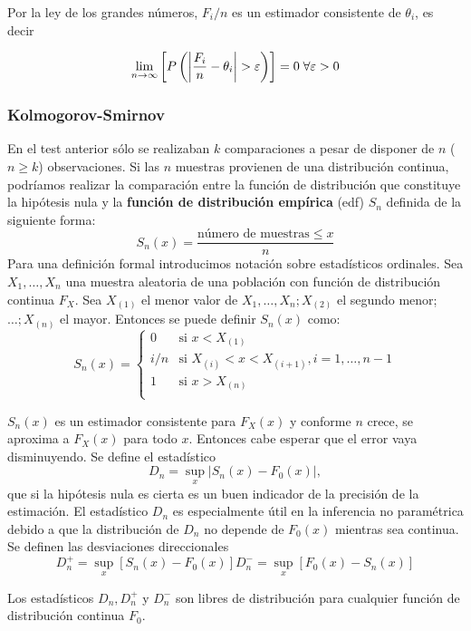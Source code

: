 	Por la ley de los grandes números, $F_i/n$ es un 
estimador consistente de $\theta_i$, es decir
	
	\[ \lim_{n \rightarrow \infty} \left[
			P \left(
				\left\lvert \frac{F_i}{n} - \theta_i \right\rvert 
					> \varepsilon
			\right) \right] = 0 \; \forall \varepsilon > 0 \]
	
	\subsubsection{Kolmogorov-Smirnov}
	
	En el test anterior sólo se realizaban $k$ comparaciones 
a pesar de disponer de $n$ ($n \geq k$) observaciones. Si las 
$n$ muestras provienen de una distribución continua, 
podríamos realizar la comparación entre la función de 
distribución que constituye la hipótesis nula y la 
\textbf{función de distribución empírica} (edf) $S_n$ 
definida de la siguiente forma:
	\[ S_n(x) = \frac{\text{número de muestras} \leq x}{n} \]
	Para una definición formal introducimos notación sobre 
estadísticos ordinales. Sea $X_1, \dots, X_n$ una muestra 
aleatoria de una población con función de distribución 
continua $F_X$. Sea $X_{(1)}$ el menor valor de $X_1, \dots, 
X_n; X_{(2)}$ el segundo menor;$ \dots; X_{(n)}$ el mayor. 
Entonces se puede definir $S_n(x)$ como:
	\[ S_n(x) = 
		\left\lbrace\begin{array}{ll}
			0 & \text{si } x < X_{(1)} \\
			i/n & \text{si } X_{(i)} < x <X_{(i+1)},
				i = 1, \dots, n-1 \\
			1 & \text{si } x > X_{(n)} \\
	\end{array}\right.
	\]
	
	$S_n(x)$ es un estimador consistente para $F_X(x)$ y 
conforme $n$ crece, se aproxima a $F_X(x)$ para todo $x$. 
Entonces cabe esperar que el error vaya disminuyendo. Se 
define el estadístico
	\[ D_n = \underset{x}{\sup} 
				\vert S_n(x) - F_0(x) \vert, \]
	que si la hipótesis nula es cierta es un buen indicador 
de la precisión de la estimación. El estadístico $D_n$ es 
especialmente útil en la inferencia no paramétrica debido a 
que la distribución de $D_n$ no depende de $F_0(x)$ mientras 
sea continua. Se definen las desviaciones direccionales
	\[ D_n^+ = \underset{x}{\sup} [S_n(x) - F_0(x)]
		D_n^- = \underset{x}{\sup} [F_0(x) - S_n(x)]\]
	
\begin{teorema}
	Los estadísticos $D_n, D_n^+$ y $D_n^-$ son libres de 
distribución para cualquier función de distribución continua
$F_0$.
\end{teorema}
	
